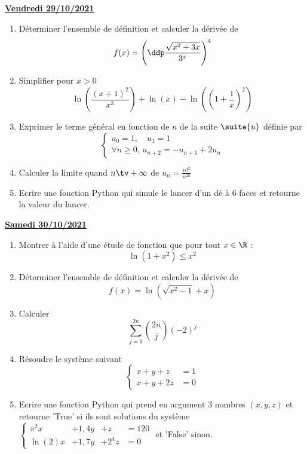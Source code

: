 \documentclass[a4paper, 11pt,reqno]{article}
\newcommand{\jour}[1]{
\begin{center}
\underline{\textbf{#1}}
\end{center}

 }
\begin{document}
\jour{Vendredi 29/10/2021}
\begin{exercice}
\begin{enumerate}
\item  Déterminer l'ensemble de définition et calculer la dérivée de
$$f(x)=\left(  \ddp\frac{\sqrt{x^2+3x}}{3^x} \right)^4$$
\item Simplifier pour $x>0$ 
$$\ln\left(\frac{(x+1)^2}{x^3}\right) +\ln(x)-\ln\left(\left(1+\frac{1}{x}\right)^2\right)$$
\item Exprimer le terme général en fonction de $n$ de la suite $\suite{u}$ définie par 
$$\left\{\begin{array}{l}
u_0 =1,\quad u_1=1\\
\forall n\geq 0,\,  u_{n+2}= -u_{n+1} +2u_n
\end{array}\right.$$
\item Calculer la limite quand $n\tv+\infty$ de $u_n=\frac{n!^2}{n^{2n}}$
\item Ecrire une fonction Python qui simule le lancer d'un dé à 6 faces et retourne la valeur du lancer. 
\end{enumerate}
\end{exercice}

\jour{Samedi 30/10/2021}
\begin{exercice}
\begin{enumerate}
\item  Montrer à l'aide d'une étude de fonction que pour tout $x\in\R$ : 
$$\ln(1+x^2) \leq x^2$$

\item  Déterminer l'ensemble de définition et calculer la dérivée de
$$f(x)=\ln{(\sqrt{x^2-1}+x)}$$
\item  Calculer 
$$\sum_{j=0}^{2n} \binom{2n}{j}(-2)^j$$
\item Résoudre le système suivant 
$$\left\{ 
\begin{array}{cc}
x+y+z&=1\\
x+y+2z&=0
\end{array}
\right.$$
\item Ecrire une fonction Python qui prend en argument 3 nombres $(x,y,z)$ et retourne 'True' si ils sont solutions du système
$\left\{ 
\begin{array}{rrrl}
\pi^2x&+1,4 y&+z&=120\\
\ln(2) x&+1,7y&+2^4z&=0
\end{array}
\right.$
et 'False' sinon. 
\end{enumerate}
\end{exercice}
\end{document}
